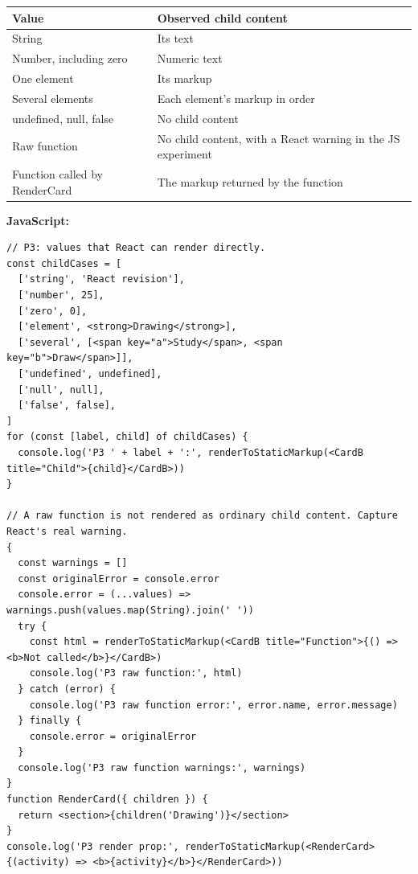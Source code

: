 \documentclass[
  11pt,
]{article}
\newcounter{none} %
\begin{document}
{\def\LTcaptype{none} %
\begin{longtable}[]{@{}
  >{\raggedright\arraybackslash}p{}
  >{\raggedright\arraybackslash}p{}@{}}
\toprule\noalign{}
\begin{minipage}[b]{\linewidth}\raggedright
Value
\end{minipage} & \begin{minipage}[b]{\linewidth}\raggedright
Observed child content
\end{minipage} \\
\midrule\noalign{}
\endhead
\bottomrule\noalign{}
\endlastfoot
String & Its text \\
Number, including zero & Numeric text \\
One element & Its markup \\
Several elements & Each element's markup in order \\
undefined, null, false & No child content \\
Raw function & No child content, with a React warning in the JS
experiment \\
Function called by RenderCard & The markup returned by the function \\
\end{longtable}
}

\textbf{JavaScript:}

\begin{lstlisting}
// P3: values that React can render directly.
const childCases = [
  ['string', 'React revision'],
  ['number', 25],
  ['zero', 0],
  ['element', <strong>Drawing</strong>],
  ['several', [<span key="a">Study</span>, <span key="b">Draw</span>]],
  ['undefined', undefined],
  ['null', null],
  ['false', false],
]
for (const [label, child] of childCases) {
  console.log('P3 ' + label + ':', renderToStaticMarkup(<CardB title="Child">{child}</CardB>))
}

// A raw function is not rendered as ordinary child content. Capture React's real warning.
{
  const warnings = []
  const originalError = console.error
  console.error = (...values) => warnings.push(values.map(String).join(' '))
  try {
    const html = renderToStaticMarkup(<CardB title="Function">{() => <b>Not called</b>}</CardB>)
    console.log('P3 raw function:', html)
  } catch (error) {
    console.log('P3 raw function error:', error.name, error.message)
  } finally {
    console.error = originalError
  }
  console.log('P3 raw function warnings:', warnings)
}
function RenderCard({ children }) {
  return <section>{children('Drawing')}</section>
}
console.log('P3 render prop:', renderToStaticMarkup(<RenderCard>{(activity) => <b>{activity}</b>}</RenderCard>))
\end{lstlisting}
\end{document}
